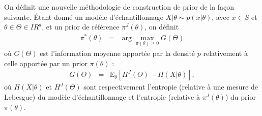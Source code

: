 \documentclass[10pt]{article}
\newcommand{\R}{I\!\!R}
\newcommand{\E}{\mbox{E}}
\newcommand{\1}{\mathbbm{1}}
\begin{document}
On définit une nouvelle méthodologie de construction de prior de la fa\c con suivante. \'Etant donné un modèle d'échantillonnage $X|\theta \sim p(x|\theta)$, avec $x\in S$ et $\theta\in\Theta\in\R^d$, et un prior de référence $\pi^J(\theta)$, on définit
\begin{eqnarray}
\pi^*(\theta) & = & \arg\max\limits_{\pi(\theta)\geq 0} G(\Theta) \label{mdiprior}
\end{eqnarray}
où $G(\Theta)$ est l'information moyenne apportée par la densité $p$ relativement à celle apportée par un prior $\pi(\theta)$ :
\begin{eqnarray*}
G(\Theta) & = & \E_{\theta}\left[H^J(\Theta) - H(X|\theta)\right],
\end{eqnarray*}
où $H(X|\theta)$ et
$H^J(\Theta)$ sont respectivement l'entropie (relative à une mesure de Lebesgue) du modèle d'échantillonnage et l'entropie (relative à $\pi^J(\theta)$) du prior $\pi(\theta)$. 
\end{document}
